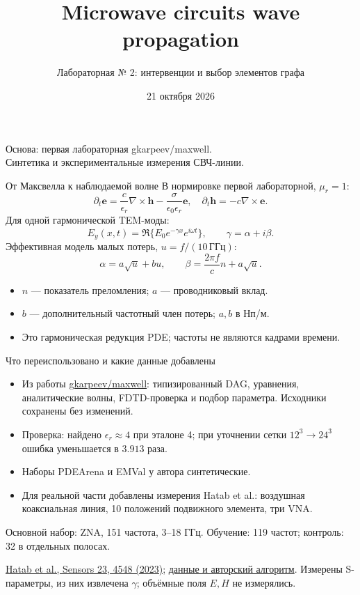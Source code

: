\documentclass{beamer}
\title{Microwave circuits wave propagation}
\subtitle{Лабораторная № 2: интервенции и выбор элементов графа}
\author{}\institute{Foundation models for spatial-time series}\date{21 октября 2026}
\begin{document}
\begin{frame}\maketitle\vspace{-1em}\begin{center}\small
Основа: первая лабораторная gkarpeev/maxwell.\\
Синтетика и экспериментальные измерения СВЧ-линии.
\end{center}\end{frame}

\begin{frame}{От Максвелла к наблюдаемой волне}\small
В нормировке первой лабораторной, $\mu_r=1$:
\[
\partial_t\mathbf e=\frac{c}{\epsilon_r}\nabla\times\mathbf h
-\frac{\sigma}{\epsilon_0\epsilon_r}\mathbf e,\quad
\partial_t\mathbf h=-c\nabla\times\mathbf e.
\]
Для одной гармонической TEM-моды:
\[
E_y(x,t)=\Re\{E_0e^{-\gamma x}e^{i\omega t}\},\qquad\gamma=\alpha+i\beta.
\]
Эффективная модель малых потерь, $u=f/(10\,\text{ГГц})$:
\[
\alpha=a\sqrt u+b u,\qquad \beta=\frac{2\pi f}{c}n+a\sqrt u.
\]
\begin{itemize}
\item $n$ --- показатель преломления; $a$ --- проводниковый вклад.
\item $b$ --- дополнительный частотный член потерь; $a,b$ в Нп/м.
\item Это гармоническая редукция PDE; частоты не являются кадрами времени.
\end{itemize}
\end{frame}

\begin{frame}{Что переиспользовано и какие данные добавлены}\small
\begin{itemize}
\item Из работы \href{https://github.com/gkarpeev/maxwell}{gkarpeev/maxwell}: типизированный DAG,
уравнения, аналитические волны, FDTD-проверка и подбор параметра. Исходники сохранены без изменений.
\item Проверка: найдено $\epsilon_r\approx4$ при эталоне 4;
при уточнении сетки $12^3\to24^3$ ошибка уменьшается в $3.913$ раза.
\item Наборы PDEArena и EMVal у автора синтетические.
\item Для реальной части добавлены измерения Hatab et al.:
воздушная коаксиальная линия, 10 положений подвижного элемента, три VNA.
\end{itemize}
Основной набор: ZNA, 151 частота, 3--18 ГГц.
Обучение: 119 частот; контроль: 32 в отдельных полосах.
\medskip

\scriptsize\href{https://doi.org/10.3390/s23094548}{Hatab et al., Sensors 23, 4548 (2023)};
\href{https://doi.org/10.3217/6bd26-5cp67}{данные и авторский алгоритм}.
Измерены S-параметры, из них извлечена $\gamma$; объёмные поля $E,H$ не измерялись.
\end{frame}
\end{document}
